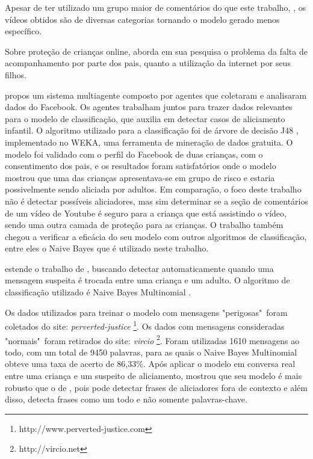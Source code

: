 Apesar de ter utilizado um grupo maior de comentários do que este trabalho, \cite{schultes2013leave}, os vídeos obtidos são de diversas categorias tornando o modelo gerado menos específico.

Sobre proteção de crianças online, \cite{marioFalcao2016} aborda em sua pesquisa o problema da falta de acompanhamento por parte dos pais, quanto a utilização da internet por seus filhos. 

\cite{marioFalcao2016} propos um sistema multiagente composto por agentes que coletaram e analisaram dados do Facebook. Os agentes trabalham juntos para trazer dados relevantes para o modelo de classificação, que auxilia em detectar casos de aliciamento infantil. O algoritmo utilizado para a classificação foi de árvore de decisão J48 \cite{quinlan1986induction}, implementado no WEKA, uma ferramenta de mineração de dados gratuita. O modelo foi validado com o perfil do Facebook de duas crianças, com o consentimento dos pais, e os resultados foram satisfatórios onde o modelo mostrou que uma das crianças apresentava-se em grupo de risco e estaria possivelmente sendo aliciada por adultos. 
Em comparação, o foco deste trabalho não é detectar possíveis aliciadores, mas sim determinar se a seção de comentários de um vídeo de Youtube é seguro para a criança que está assistindo o vídeo, sendo uma outra camada de proteção para as crianças. O trabalho \cite{marioFalcao2016} também chegou a verificar a eficácia do seu modelo com outros algoritmos de classificação, entre eles o Naive Bayes que é utilizado neste trabalho.

\cite{EnyoGoncalves2017} estende o trabalho de \cite{marioFalcao2016}, buscando detectar automaticamente quando uma mensagem suspeita é trocada entre uma criança e um adulto. O algoritmo de classificação utilizado é Naive Bayes Multinomial \cite{metsis2006spamBayes}.

Os dados utilizados para treinar o modelo com mensagens "perigosas"\ foram coletados do site: \textit{perverted-justice} \footnote{http://www.perverted-justice.com}. Os dados com mensagens consideradas "normais"\  foram retirados do site: \textit{vircio} \footnote{http://vircio.net}. Foram utilizadas 1610 mensagens ao todo, com um total de 9450 palavras, para as quais o Naive Bayes Multinomial obteve uma taxa de acerto de 86,33\%. Após aplicar o modelo em conversa real entre uma criança e um suspeito de aliciamento, \cite{EnyoGoncalves2017} mostrou que seu modelo é mais robusto que o de \cite{marioFalcao2016}, pois pode detectar frases de aliciadores fora de contexto e além disso, detecta frases como um todo e não somente palavras-chave.

